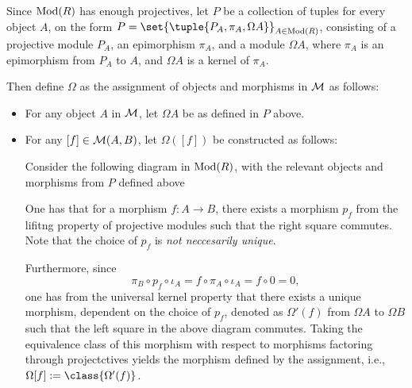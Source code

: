 \begin{definition}
    \label{def:stmod_omega}
    Since \( \operatorname{Mod}(R) \) has enough projectives, let \( P \) be a collection of tuples for every object \( A \), on the form \( P = \set{\tuple{P_A, \pi_A, \Omega A}}_{A \in \Mod(R)} \), consisting of a projective module \( P_A \), an epimorphism \( \pi_A \), and a module \( \Omega A \), where \( \pi_A \) is an epimorphism from \( P_A \) to \( A \), and \( \Omega A \) is a kernel of \( \pi_A \).

    Then define \( \Omega \) as the assignment of objects and morphisms in \( {\mathcal{M}} \) as follows:
    \begin{itemize}
        \item {
            For any object \( A \) in \( {\mathcal{M}} \), let \( \Omega A \) be as defined in \( P \) above.
        }
        \item {
            For any \( [f] \in {\mathcal{M}}(A, B) \), let \( \Omega([f]) \) be constructed as follows:

            Consider the following diagram in \( \operatorname{Mod}(R) \), with the relevant objects and morphisms from \( P \) defined above
            \begin{center}
            \end{center}

            One has that for a morphism \( f: A \to B \), there exists a morphism \( p_f \) from the lifitng property of projective modules such that the right square commutes. Note that the choice of \( p_f \) is \emph{not neccesarily unique}.

            Furthermore, since
            \[
                \pi_B \circ p_f \circ \iota_A = f \circ \pi_A \circ \iota_A = f \circ 0 = 0,
            \]
            one has from the universal kernel property that there exists a unique morphism, dependent on the choice of \( p_f \), denoted as \( \Omega'(f) \) from \( \Omega A \) to \( \Omega B \) such that the left square in the above diagram commutes. Taking the equivalence class of this morphism with respect to morphisms factoring through projectctives yields the morphism defined by the assignment, i.e., \( \Omega [f] := \class{\Omega'(f)} \).
        }
    \end{itemize}
\end{definition}

